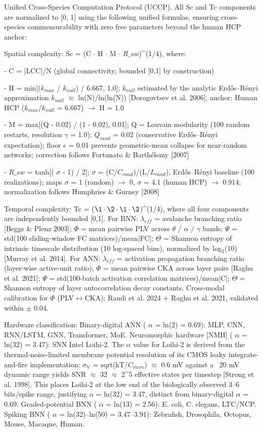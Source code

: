 \documentclass[a4paper,12pt]{article}
\providecommand{\textsubscript}[1]{\ensuremath{_{\text{#1}}}}
\begin{document}
Unified Cross-Species Computation Protocol (UCCP). All Sc and Tc components are normalized to [0, 1] using the following unified formulas, ensuring cross-species commensurability with zero free parameters beyond the human HCP anchor:

Spatial complexity: Sc = (C  $\cdot$  H  $\cdot$  M  $\cdot$  $R\_{sw}$)^(1/4), where:

- C = |LCC|/N (global connectivity; bounded [0,1] by construction)

- H = min[($k_{max}$ / $k_{null}$) / 6.667, 1.0]; $k_{null}$ estimated by the analytic Erd\H{o}s--R\'enyi approximation $k_{null}$  $\approx$  ln(N)/ln(ln(N)) [Dorogovtsev et al. 2006]; anchor: Human HCP ($k_{max}$/$k_{null}$ = 6.667)  $\rightarrow$  H = 1.0

- M = max[(Q - 0.02) / (1 - 0.02), 0.01]; Q = Louvain modularity (100 random restarts, resolution  $\gamma$  = 1.0); $Q_{rand}$ = 0.02 (conservative Erd\H{o}s--R\'enyi expectation); floor $\epsilon$ = 0.01 prevents geometric-mean collapse for near-random networks; correction follows Fortunato \& Barth\'elemy [2007]

- $R\_{sw}$ = tanh[( $\sigma$  - 1) / 2];  $\sigma$  = (C/$C_{rand}$)/(L/$L_{rand}$), Erd\H{o}s--R\'enyi baseline (100 realizations); maps  $\sigma$  = 1 (random)  $\rightarrow$  0,  $\sigma$  = 4.1 (human HCP)  $\rightarrow$  0.914; normalization follows Humphries \& Gurney [2008]

Temporal complexity: Tc = ($\1 \cdot \2 \cdot \1 \cdot \2$)^(1/4), where all four components are independently bounded [0,1].
For BNN: $\lambda_{eff}$ = avalanche branching ratio [Beggs \& Plenz 2003];  $\Phi$  = mean pairwise PLV across  $\theta$ / $\alpha$ / $\gamma$  bands;  $\Psi$  = std(100 sliding-window FC matrices)/mean|FC|; $\Theta$ = Shannon entropy of intrinsic timescale distribution (10 log-spaced bins), normalized by log\textsubscript{2}(10) [Murray et al. 2014].
For ANN: $\lambda_{eff}$ = activation propagation branching ratio (layer-wise active-unit ratio);  $\Phi$  = mean pairwise CKA across layer pairs [Raghu et al. 2021];  $\Psi$  = std(100-batch activation correlation matrices)/mean|C|; $\Theta$ = Shannon entropy of layer autocorrelation decay constants.
Cross-modal calibration for  $\Phi$  (PLV$\leftrightarrow$CKA): Randi et al. 2024 + Raghu et al. 2021, validated within  $\pm$ 0.04.

Hardware classification: Binary-digital ANN ( $\alpha$  = ln(2) = 0.69): MLP, CNN, RNN/LSTM, GNN, Transformer, MoE.
Neuromorphic hardware [NMH\dag] ( $\alpha$  = ln(32) = 3.47): SNN Intel Loihi-2.
The  $\alpha$  value for Loihi-2 is derived from the thermal-noise-limited membrane potential resolution of its CMOS leaky integrate-and-fire implementation: $\sigma_{\text{V}}$ = sqrt(kT/$C_{mem}$)  $\approx$  0.6 mV against a ~20 mV dynamic range yields SNR  $\approx$  32  $\approx$  2^5 effective states per timestep [Strong et al. 1998].
This places Loihi-2 at the low end of the biologically observed 3--6 bits/spike range, justifying  $\alpha$  = ln(32) = 3.47, distinct from binary-digital  $\alpha$  = 0.69.
Graded-potential BNN ( $\alpha$  = ln(13) = 2.56): E. coli, C. elegans, LTC/NCP.
Spiking BNN ( $\alpha$  = ln(32)--ln(50) = 3.47--3.91): Zebrafish, Drosophila, Octopus, Mouse, Macaque, Human.
\end{document}
